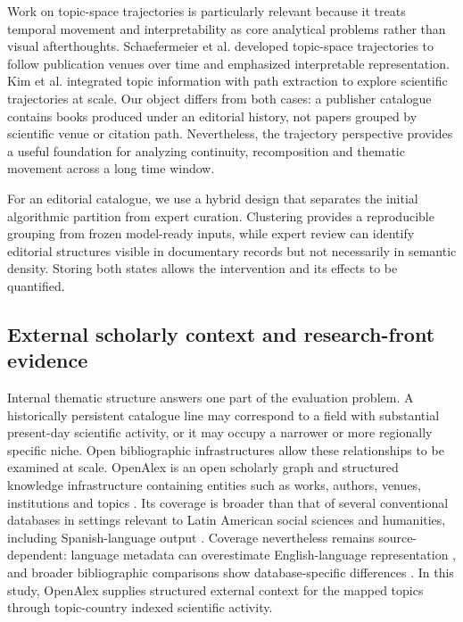 \documentclass[futureinternet,article,submit,moreauthors]{Definitions/mdpi}
\begin{document}
Work on topic-space trajectories is particularly relevant because it treats temporal movement and interpretability as core analytical problems rather than visual afterthoughts. Schaefermeier et al. \citep{schaefermeier2021topicspace} developed topic-space trajectories to follow publication venues over time and emphasized interpretable representation. Kim et al. \citep{kim2022trajectories} integrated topic information with path extraction to explore scientific trajectories at scale. Our object differs from both cases: a publisher catalogue contains books produced under an editorial history, not papers grouped by scientific venue or citation path. Nevertheless, the trajectory perspective provides a useful foundation for analyzing continuity, recomposition and thematic movement across a long time window.

For an editorial catalogue, we use a hybrid design that separates the initial algorithmic partition from expert curation. Clustering provides a reproducible grouping from frozen model-ready inputs, while expert review can identify editorial structures visible in documentary records but not necessarily in semantic density. Storing both states allows the intervention and its effects to be quantified.

\subsection{External scholarly context and research-front evidence}

Internal thematic structure answers one part of the evaluation problem. A historically persistent catalogue line may correspond to a field with substantial present-day scientific activity, or it may occupy a narrower or more regionally specific niche. Open bibliographic infrastructures allow these relationships to be examined at scale. OpenAlex is an open scholarly graph and structured knowledge infrastructure containing entities such as works, authors, venues, institutions and topics \citep{priem2022openalex}. Its coverage is broader than that of several conventional databases in settings relevant to Latin American social sciences and humanities, including Spanish-language output \citep{gallardo2024openalex}. Coverage nevertheless remains source-dependent: language metadata can overestimate English-language representation \citep{cespedes2025linguistic}, and broader bibliographic comparisons show database-specific differences \citep{visser2021comparison}. In this study, OpenAlex supplies structured external context for the mapped topics through topic-country indexed scientific activity.
\end{document}
